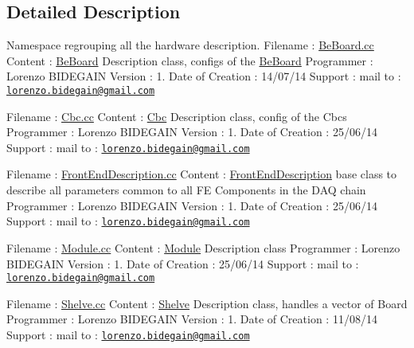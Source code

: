 \subsection{Detailed Description}
Namespace regrouping all the hardware description. Filename \-: \hyperlink{_be_board_8cc}{Be\-Board.\-cc} Content \-: \hyperlink{class_ph2___hw_description_1_1_be_board}{Be\-Board} Description class, configs of the \hyperlink{class_ph2___hw_description_1_1_be_board}{Be\-Board} Programmer \-: Lorenzo B\-I\-D\-E\-G\-A\-I\-N Version \-: 1. Date of Creation \-: 14/07/14 Support \-: mail to \-: \href{mailto:lorenzo.bidegain@gmail.com}{\tt lorenzo.\-bidegain@gmail.\-com}

Filename \-: \hyperlink{_cbc_8cc}{Cbc.\-cc} Content \-: \hyperlink{class_ph2___hw_description_1_1_cbc}{Cbc} Description class, config of the Cbcs Programmer \-: Lorenzo B\-I\-D\-E\-G\-A\-I\-N Version \-: 1. Date of Creation \-: 25/06/14 Support \-: mail to \-: \href{mailto:lorenzo.bidegain@gmail.com}{\tt lorenzo.\-bidegain@gmail.\-com}

Filename \-: \hyperlink{_front_end_description_8cc}{Front\-End\-Description.\-cc} Content \-: \hyperlink{class_ph2___hw_description_1_1_front_end_description}{Front\-End\-Description} base class to describe all parameters common to all F\-E Components in the D\-A\-Q chain Programmer \-: Lorenzo B\-I\-D\-E\-G\-A\-I\-N Version \-: 1. Date of Creation \-: 25/06/14 Support \-: mail to \-: \href{mailto:lorenzo.bidegain@gmail.com}{\tt lorenzo.\-bidegain@gmail.\-com}

Filename \-: \hyperlink{_module_8cc}{Module.\-cc} Content \-: \hyperlink{class_ph2___hw_description_1_1_module}{Module} Description class Programmer \-: Lorenzo B\-I\-D\-E\-G\-A\-I\-N Version \-: 1. Date of Creation \-: 25/06/14 Support \-: mail to \-: \href{mailto:lorenzo.bidegain@gmail.com}{\tt lorenzo.\-bidegain@gmail.\-com}

Filename \-: \hyperlink{_shelve_8cc}{Shelve.\-cc} Content \-: \hyperlink{class_ph2___hw_description_1_1_shelve}{Shelve} Description class, handles a vector of Board Programmer \-: Lorenzo B\-I\-D\-E\-G\-A\-I\-N Version \-: 1. Date of Creation \-: 11/08/14 Support \-: mail to \-: \href{mailto:lorenzo.bidegain@gmail.com}{\tt lorenzo.\-bidegain@gmail.\-com} 

